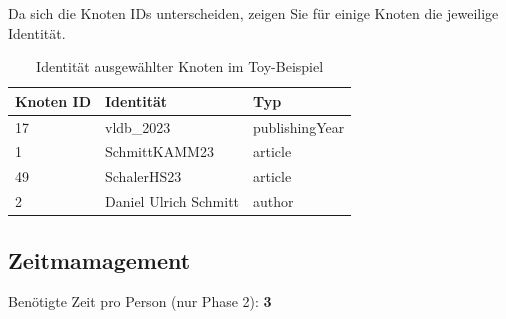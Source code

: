 \documentclass[11pt]{scrartcl}
\begin{document}
Da sich die Knoten IDs unterscheiden, zeigen Sie für einige Knoten die jeweilige Identität.

\begin{table}[h]
	\centering
	\begin{center}
		\begin{tabular}{ l | l | l }
			\toprule
			Knoten ID & Identität             & Typ            \\
			\midrule
			17        & vldb\_2023            & publishingYear \\
			1         & SchmittKAMM23         & article        \\
			49        & SchalerHS23           & article        \\
			2         & Daniel Ulrich Schmitt & author         \\
			\bottomrule
		\end{tabular}
	\end{center}
	\caption{Identität ausgewählter Knoten im Toy-Beispiel}
	\label{tab:KnotenIdentitaetenOneAxis}
\end{table}

\subsection*{Zeitmamagement}

Benötigte Zeit pro Person (nur Phase 2): \textbf{3}
\end{document}
